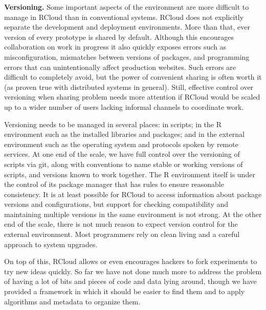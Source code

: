 {\bf Versioning.}
Some important aspects of the environment are more difficult to manage
in RCloud than in conventional systems. RCloud does not explicitly
separate the development and deployment environments. More than that,
ever version of every prototype is shared by default. Although this encourages
collaboration on work in progress it also quickly exposes errors such as
misconfiguration, mismatches between versions of packages, and programming
errors that can unintentionally affect production websites. Such errors
are difficult to completely avoid, but the power of convenient sharing is often
worth it (as proven true with distributed systems in general).
Still, effective control over versioning when sharing problem needs more
attention if RCloud would be scaled up to a wider number of users lacking
informal channels to coordinate work.

Versioning needs to be managed in several places: in scripts;
in the R environment such as the installed libraries and packages;
and in the external environment such as the operating system and
protocols spoken by remote services. At one end of the scale, we have
full control over the versioning of scripts via git, along with conventions
to name stable or working versions of scripts, and versions known to work together.
The R environment itself is under the control of its package manager
that has rules to ensure reasonable consistency.
It is at least possible for RCloud to access information about
package versions and configurations, but support for checking compatibility
and maintaining multiple versions in the same environment is not strong.
At the other end of the scale, there is not much reason to expect version
control for the external environment. Most programmers rely on clean living
and a careful approach to system upgrades.

On top of this, RCloud allows or even encourages hackers to fork experiments
to try new ideas quickly. So far we have not done much more to address the
problem of having a lot of bits and pieces of code and data lying around,
though we have provided a framework in which it should be easier to find them
and to apply algorithms and metadata to organize them.


